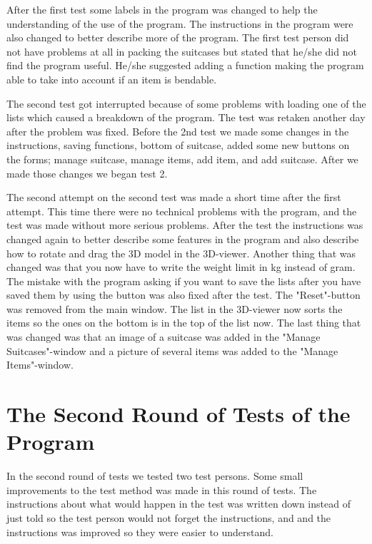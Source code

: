 After the first test some labels in the program was changed to help the understanding of the use of the program. The instructions in the program were also changed to better describe more of the program. The first test person did not have problems at all in packing the suitcases but stated that he/she did not find the program useful. He/she suggested adding a function making the program able to take into account if an item is bendable.

The second test got interrupted because of some problems with loading one of the lists which caused a breakdown of the program. The test was retaken another day after the problem was fixed. Before the 2nd test we made some changes in the instructions, saving functions, bottom of suitcase, added some new buttons on the forms; manage suitcase, manage items, add item, and add suitcase. After we made those changes we began test 2.

The second attempt on the second test was made a short time after the first attempt. This time there were no technical problems with the program, and the test was made without more serious problems. After the test the instructions was changed again to better describe some features in the program and also describe how to rotate and drag the 3D model in the 3D-viewer. Another thing that was changed was that you now have to write the weight limit in kg instead of gram. The mistake with the program asking if you want to save the lists after you have saved them by using the button was also fixed after the test. The "Reset"-button was removed from the main window. The list in the 3D-viewer now sorts the items so the ones on the bottom is in the top of the list now. The last thing that was changed was that an image of a suitcase was added in the "Manage Suitcases"-window and a picture of several items was added to the "Manage Items"-window.

\section{The Second Round of Tests of the Program}
In the second round of tests we tested two test persons. Some small improvements to the test method was made in this round of tests. The instructions about what would happen in the test was written down instead of just told so the test person would not forget the instructions, and and the instructions was improved so they were easier to understand.

